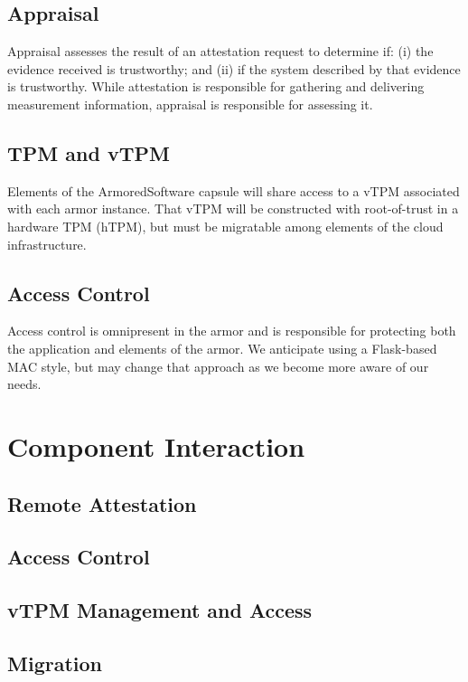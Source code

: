 \documentclass[10pt]{article}
\begin{document}
\subsection{Appraisal}

Appraisal assesses the result of an attestation request to determine
if: (i) the evidence received is trustworthy; and (ii) if the
system described by that evidence is trustworthy.  While attestation
is responsible for gathering and delivering measurement information,
appraisal is responsible for assessing it.

\subsection{TPM and vTPM}

Elements of the ArmoredSoftware capsule will share access to a vTPM
associated with each armor instance.  That vTPM will be constructed with
root-of-trust in a hardware TPM (hTPM), but must be migratable among
elements of the cloud infrastructure.

\subsection{Access Control}

Access control is omnipresent in the armor and is responsible for
protecting both the application and elements of the armor.  We
anticipate using a Flask-based MAC style, but may change that approach
as we become more aware of our needs.

\section{Component Interaction}

\subsection{Remote Attestation}

\subsection{Access Control}

\subsection{vTPM Management and Access}

\subsection{Migration}
\end{document}
